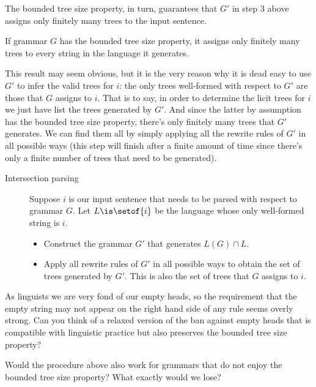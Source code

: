 The bounded tree size property, in turn, guarantees that $G'$ in step 3 above assigns only finitely many trees to the input sentence.
%
\begin{lemma}
    If grammar $G$ has the bounded tree size property, it assigns only finitely many trees to every string in the language it generates.
\end{lemma}
%
This result may seem obvious, but it is the very reason why it is dead easy to use $G'$ to infer the valid trees for $i$: the only trees well-formed with respect to $G'$ are those that $G$ assigns to $i$.
That is to say, in order to determine the licit trees for $i$ we just have list the trees generated by $G'$.
And since the latter by assumption has the bounded tree size property, there's only finitely many trees that $G'$ generates.
We can find them all by simply applying all the rewrite rules of $G'$ in all possible ways (this step will finish after a finite amount of time since there's only a finite number of trees that need to be generated).

\begin{description}
    \item[Intersection parsing] Suppose $i$ is our input sentence that needs to be parsed with respect to grammar $G$.
        Let $L \is \setof{i}$ be the language whose only well-formed string is $i$.
        \begin{itemize}
            \item Construct the grammar $G'$ that generates $L(G) \cap L$.
            \item Apply all rewrite rules of $G'$ in all possible ways to obtain the set of trees generated by $G'$.
                This is also the set of trees that $G$ assigns to $i$.
        \end{itemize}
\end{description}

\begin{exercise}
    As linguists we are very fond of our empty heads, so the requirement that the empty string may not appear on the right hand side of any rule seems overly strong.
    Can you think of a relaxed version of the ban against empty heads that is compatible with linguistic practice but also preserves the bounded tree size property?
\end{exercise}
%
\begin{exercise}
    Would the procedure above also work for grammars that do not enjoy the bounded tree size property?
    What exactly would we lose?
\end{exercise}

